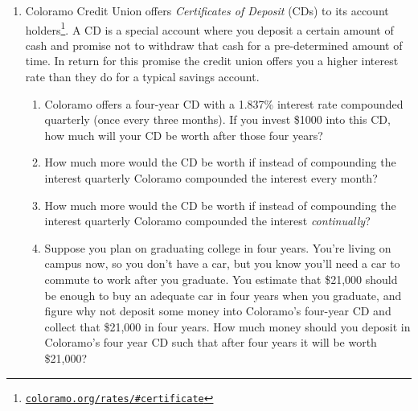 \begin{enumerate}
        \newpage


    \item 
        Coloramo Credit Union offers \emph{Certificates of Deposit} (CDs)
        to its account holders\footnote{\href{https://www.coloramo.org/rates/\#certificate}{\texttt{coloramo.org/rates/\#certificate}}}.
        A CD is a special account where you deposit 
        a certain amount of cash and promise
        not to withdraw that cash for a pre-determined amount of time.
        In return for this promise the credit union offers you a higher interest rate
        than they do for a typical savings account.
        \begin{enumerate}
            \item
                Coloramo offers a four-year CD with a 1.837\% interest rate
                compounded quarterly (once every three months).
                If you invest \$1000 into this CD,
                how much will your CD be worth after those four years?
                \vfill\null
            \item
                How much more would the CD be worth 
                if instead of compounding the interest quarterly
                Coloramo compounded the interest every month?
                \vfill\null
            \item
                How much more would the CD be worth 
                if instead of compounding the interest quarterly
                Coloramo compounded the interest \emph{continually}?
                \vfill\null
            \item
                Suppose you plan on graduating college in four years.
                You're living on campus now, so you don't have a car, 
                but you know you'll need a car to commute to work after you graduate.
                You estimate that \$21,000 should be enough to buy an adequate car
                in four years when you graduate, and figure why not
                deposit some money into Coloramo's four-year CD 
                and collect that \$21,000 in four years.
                How much money should you deposit in Coloramo's four year CD
                such that after four years it will be worth \$21,000?
                \vfill\null
                \vfill\null
                \vfill\null
        \end{enumerate}

\end{enumerate}

